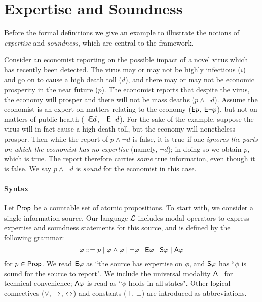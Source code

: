 \section{Expertise and Soundness}
\label{exp_sec_expertise_and_soundness}

Before the formal definitions we give an example to illustrate the notions of
\emph{expertise} and \emph{soundness}, which are central to the framework.

\begin{example}
    \label{exp_ex_economist_motivation}

    Consider an economist reporting on the possible impact of a novel virus
    which has recently been detected. The virus may or may not be highly
    infectious ($i$) and go on to cause a high death toll ($d$), and there may
    or may not be economic prosperity in the near future ($p$). The economist
    reports that despite the virus, the economy will prosper and there will not
    be mass deaths ($p \land \neg d$). Assume the economist is an expert on
    matters relating to the economy ($\E p$, $\E\neg p$), but not on matters of
    public health ($\neg\E d$, $\neg\E\neg d$). For the sake of the example,
    suppose the virus will in fact cause a high death toll, but the economy
    will nonetheless prosper. Then while the report of $p \land \neg d$ is
    false, it is true if one \emph{ignores the parts on which the economist has
    no expertise} (namely, $\neg d$); in doing so we obtain $p$, which is true.
    The report therefore carries \emph{some} true information, even though it
    is false. We say $p \land \neg d$ is \emph{sound} for the economist in this
    case.

\end{example}

\paragraph{Syntax}

Let $\Prop$ be a countable set of atomic propositions.
%
To start with, we consider a single information source. Our language $\cL$
includes modal operators to express expertise and soundness statements for this
source, and is defined by the following grammar:
\[
\phi ::=
 p \mid
 \phi \land \phi \mid
 \neg\phi \mid
 \E\phi \mid
 \S\phi \mid
 \A\phi
\]
for $p \in \Prop$. We read $\E\phi$ as ``the source has expertise on
$\phi$, and $\S\phi$ has ``$\phi$ is sound for the source to
report". We include the universal modality $\A$~\cite{goranko_1992}
for technical convenience; $\A\phi$ is read as ``$\phi$ holds in all
states".  Other logical connectives ($\lor$, $\limplies$,
$\liff$) and constants ($\top$, $\bot$) are introduced as
abbreviations.

